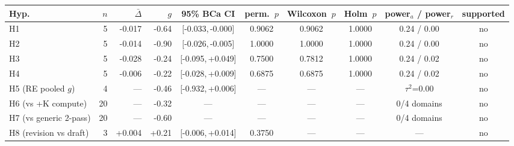 \begin{tabular}{l r r r c c c c c c}
\toprule
Hyp. & $n$ & $\bar\Delta$ & $g$ & 95\% BCa CI & perm.~$p$ & Wilcoxon~$p$ & Holm~$p$ & power$_a$ / power$_r$ & supported \\
\midrule
H1 & 5 & -0.017 & -0.64 & [-0.033,\,-0.000] & 0.9062 & 0.9062 & 1.0000 & 0.24 / 0.00 & no \\
H2 & 5 & -0.014 & -0.90 & [-0.026,\,-0.005] & 1.0000 & 1.0000 & 1.0000 & 0.24 / 0.00 & no \\
H3 & 5 & -0.028 & -0.24 & [-0.095,\,+0.049] & 0.7500 & 0.7812 & 1.0000 & 0.24 / 0.02 & no \\
H4 & 5 & -0.006 & -0.22 & [-0.028,\,+0.009] & 0.6875 & 0.6875 & 1.0000 & 0.24 / 0.02 & no \\
H5 (RE pooled $g$) & 4 & --- & -0.46 & [-0.932,\,+0.006] & --- & --- & --- & $\tau^2$=0.00 & no \\
H6 (vs +K compute) & 20 & --- & -0.32 & --- & --- & --- & --- & 0/4 domains & no \\
H7 (vs generic 2-pass) & 20 & --- & -0.60 & --- & --- & --- & --- & 0/4 domains & no \\
H8 (revision vs draft) & 3 & +0.004 & +0.21 & [-0.006,\,+0.014] & 0.3750 & --- & --- & --- & no \\
\bottomrule
\end{tabular}
